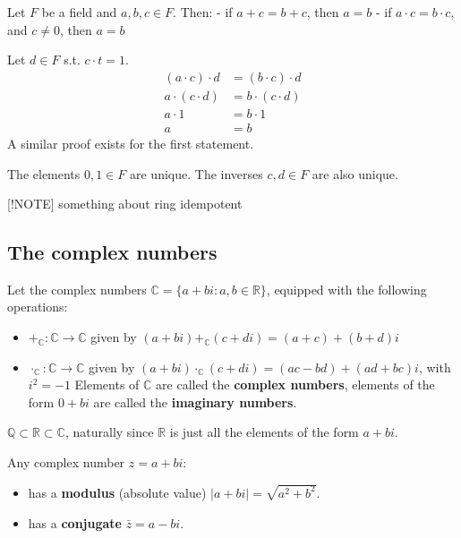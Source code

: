 \documentclass[12pt]{article}
\begin{document}
\begin{thm}
    Let ${}F{}$ be a field and ${}a,b,c\in F{}$. Then:
    - if ${}a+c = b+c{}$, then ${}a=b{}$
    - if ${}a \cdot c = b \cdot c{}$, and ${}c \neq 0{}$, then ${}a=b{}$
\end{thm}
\begin{pf}
    Let ${}d \in F{}$ s.t. ${}c \cdot t = 1{}$.
    \begin{align}
        (a \cdot c) \cdot d &= (b \cdot c) \cdot d \\
        a \cdot (c \cdot d) &= b \cdot (c \cdot d) \\
        a \cdot 1  &= b \cdot 1 \\
        a & = b
    \end{align}
    A similar proof exists for the first statement.
\end{pf}
\begin{cor}
    The elements ${}0,1 \in F{}$ are unique. The inverses ${}c,d \in F{}$ are also unique.
\end{cor}

[!NOTE] something about ring idempotent

\subsection{The complex numbers}
\begin{defn}
    Let the complex numbers ${}\mathbb{C} = \{  a+ bi: a,b \in \mathbb{R} \}{}$, equipped with the following operations:
    \begin{itemize}
        \item ${}+_{\mathbb{C}}:\mathbb{C}\to \mathbb{C}{}$ given by ${}(a+bi)+_{\mathbb{C}}(c+di)=(a+c)+(b+d)i{}$
        \item ${}\cdot_{\mathbb{C}}:\mathbb{C}\to \mathbb{C}{}$ given by ${}(a+bi)\cdot_{\mathbb{C}}(c+di)=(ac - bd)+(ad + bc)i{}$, with ${}i^2 = -1{}$
            Elements of ${}\mathbb{C}{}$ are called the \textbf{complex numbers}, elements of the form ${}0 + bi{}$ are called the \textbf{imaginary numbers}.
    \end{itemize}
\end{defn}
\begin{ex}
    ${}\mathbb{Q} \subset \mathbb{R} \subset \mathbb{C}{}$, naturally since ${}\mathbb{R}{}$ is just all the elements of the form ${}a + bi{}$.
\end{ex}

\begin{defn}
    Any complex number ${}z = a+bi{}$:
    \begin{itemize}
        \item has a \textbf{modulus} (absolute value) ${}\lvert a+bi \rvert = \sqrt{a^{2}+b^{2} }{}$.
        \item has a \textbf{conjugate} ${}\bar{z} = a -bi{}$.
    \end{itemize}
\end{defn}
\end{document}
